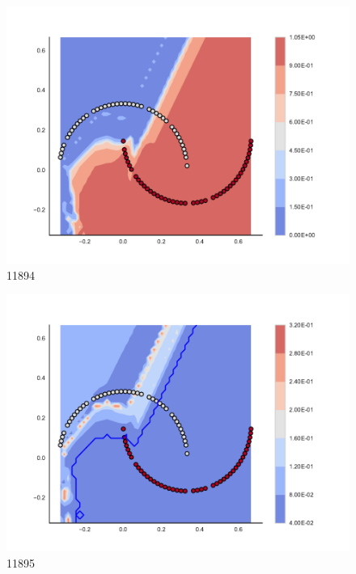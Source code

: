 \begin{subfigure}[b]{0.09\textwidth}
    \includegraphics[clip, trim=2.35cm 1.75cm 4.5cm 0cm,width=\textwidth]{img/convergence/11894.pdf}
    \caption{11894}
    \label{fig:convergence_11894}
\end{subfigure}
%
\begin{subfigure}[b]{0.09\textwidth}
    \includegraphics[clip, trim=2.35cm 1.75cm 4.5cm 0cm,width=\textwidth]{img/convergence/11895.pdf}
    \caption{11895}
    \label{fig:convergence_11895}
\end{subfigure}
%
